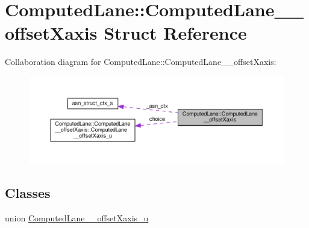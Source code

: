 \hypertarget{structComputedLane_1_1ComputedLane____offsetXaxis}{}\section{Computed\+Lane\+:\+:Computed\+Lane\+\_\+\+\_\+offset\+Xaxis Struct Reference}
\label{structComputedLane_1_1ComputedLane____offsetXaxis}


Collaboration diagram for Computed\+Lane\+:\+:Computed\+Lane\+\_\+\+\_\+offset\+Xaxis\+:\nopagebreak
\begin{figure}[H]
\begin{center}
\leavevmode
\includegraphics[width=350pt]{structComputedLane_1_1ComputedLane____offsetXaxis__coll__graph}
\end{center}
\end{figure}
\subsection*{Classes}
\begin{DoxyCompactItemize}
\item 
union \hyperlink{unionComputedLane_1_1ComputedLane____offsetXaxis_1_1ComputedLane____offsetXaxis__u}{Computed\+Lane\+\_\+\+\_\+offset\+Xaxis\+\_\+u}
\end{DoxyCompactItemize}
